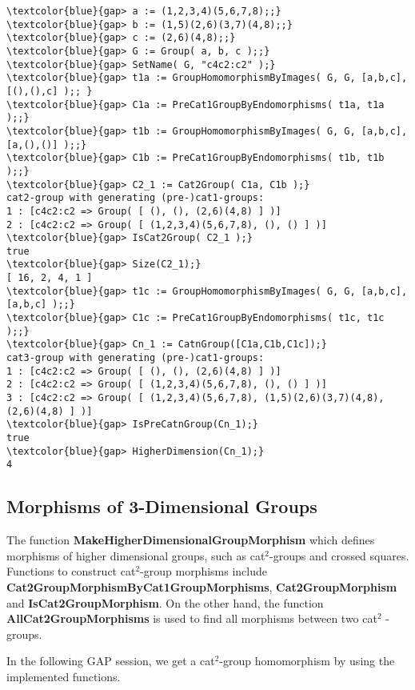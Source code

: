 \documentclass[a4paper,11pt]{article}
\theoremstyle{plain}
\theoremstyle{definition}
\begin{document}
\begin{Verbatim}[frame=single, fontsize=\small, commandchars=\\\{\}]
\textcolor{blue}{gap> a := (1,2,3,4)(5,6,7,8);;}
\textcolor{blue}{gap> b := (1,5)(2,6)(3,7)(4,8);;}
\textcolor{blue}{gap> c := (2,6)(4,8);;}
\textcolor{blue}{gap> G := Group( a, b, c );;}
\textcolor{blue}{gap> SetName( G, "c4c2:c2" );}
\textcolor{blue}{gap> t1a := GroupHomomorphismByImages( G, G, [a,b,c], [(),(),c] );; }
\textcolor{blue}{gap> C1a := PreCat1GroupByEndomorphisms( t1a, t1a );;}
\textcolor{blue}{gap> t1b := GroupHomomorphismByImages( G, G, [a,b,c], [a,(),()] );;}
\textcolor{blue}{gap> C1b := PreCat1GroupByEndomorphisms( t1b, t1b );;}
\textcolor{blue}{gap> C2_1 := Cat2Group( C1a, C1b );}
cat2-group with generating (pre-)cat1-groups:
1 : [c4c2:c2 => Group( [ (), (), (2,6)(4,8) ] )]
2 : [c4c2:c2 => Group( [ (1,2,3,4)(5,6,7,8), (), () ] )]
\textcolor{blue}{gap> IsCat2Group( C2_1 );}
true
\textcolor{blue}{gap> Size(C2_1);}
[ 16, 2, 4, 1 ]
\textcolor{blue}{gap> t1c := GroupHomomorphismByImages( G, G, [a,b,c], [a,b,c] );;}
\textcolor{blue}{gap> C1c := PreCat1GroupByEndomorphisms( t1c, t1c );;}
\textcolor{blue}{gap> Cn_1 := CatnGroup([C1a,C1b,C1c]);}
cat3-group with generating (pre-)cat1-groups:
1 : [c4c2:c2 => Group( [ (), (), (2,6)(4,8) ] )]
2 : [c4c2:c2 => Group( [ (1,2,3,4)(5,6,7,8), (), () ] )]
3 : [c4c2:c2 => Group( [ (1,2,3,4)(5,6,7,8), (1,5)(2,6)(3,7)(4,8),
(2,6)(4,8) ] )]
\textcolor{blue}{gap> IsPreCatnGroup(Cn_1);}
true
\textcolor{blue}{gap> HigherDimension(Cn_1);}
4
\end{Verbatim}


\subsection{Morphisms of 3-Dimensional Groups}

The function \textbf{MakeHigherDimensionalGroupMorphism} which defines
morphisms of higher dimensional groups, such as cat$^{2}$-groups and crossed
squares. Functions to construct cat$^{2}$-group morphisms include \textbf{%
	Cat2GroupMorphismByCat1GroupMorphisms}, \textbf{Cat2GroupMorphism} and
\textbf{IsCat2GroupMorphism}. On the other hand, the function \textbf{%
	AllCat2GroupMorphisms} is used to find all morphisms between two cat$^{2}$%
-groups.

In the following \textsf{GAP} session, we get a cat$^{2}$-group homomorphism
by using the implemented functions.
\end{document}
